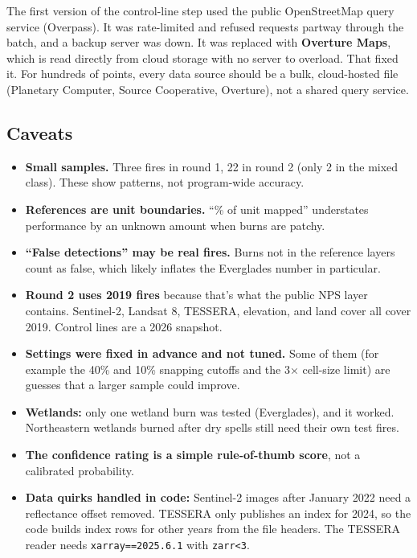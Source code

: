 \documentclass[
]{article}
\providecommand{\tightlist}{%
  \setlength{\itemsep}{0pt}\setlength{\parskip}{0pt}}
\begin{document}
The first version of the control-line step used the public OpenStreetMap
query service (Overpass). It was rate-limited and refused requests
partway through the batch, and a backup server was down. It was replaced
with \textbf{Overture Maps}, which is read directly from cloud storage
with no server to overload. That fixed it. For hundreds of points, every
data source should be a bulk, cloud-hosted file (Planetary Computer,
Source Cooperative, Overture), not a shared query service.

\subsection{Caveats}\label{caveats}

\begin{itemize}
\tightlist
\item
  \textbf{Small samples.} Three fires in round 1, 22 in round 2 (only 2
  in the mixed class). These show patterns, not program-wide accuracy.
\item
  \textbf{References are unit boundaries.} ``\% of unit mapped''
  understates performance by an unknown amount when burns are patchy.
\item
  \textbf{``False detections'' may be real fires.} Burns not in the
  reference layers count as false, which likely inflates the Everglades
  number in particular.
\item
  \textbf{Round 2 uses 2019 fires} because that's what the public NPS
  layer contains. Sentinel-2, Landsat 8, TESSERA, elevation, and land
  cover all cover 2019. Control lines are a 2026 snapshot.
\item
  \textbf{Settings were fixed in advance and not tuned.} Some of them
  (for example the 40\% and 10\% snapping cutoffs and the 3× cell-size
  limit) are guesses that a larger sample could improve.
\item
  \textbf{Wetlands:} only one wetland burn was tested (Everglades), and
  it worked. Northeastern wetlands burned after dry spells still need
  their own test fires.
\item
  \textbf{The confidence rating is a simple rule-of-thumb score}, not a
  calibrated probability.
\item
  \textbf{Data quirks handled in code:} Sentinel-2 images after January
  2022 need a reflectance offset removed. TESSERA only publishes an
  index for 2024, so the code builds index rows for other years from the
  file headers. The TESSERA reader needs \texttt{xarray==2025.6.1} with
  \texttt{zarr\textless{}3}.
\end{itemize}
\end{document}
